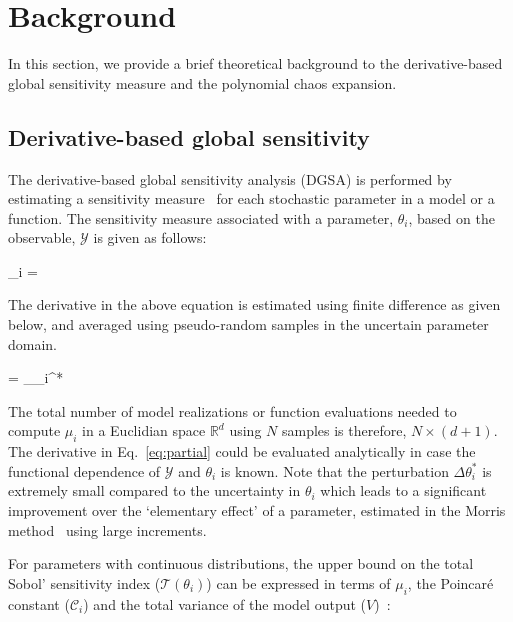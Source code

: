\section{Background}
\label{sec:bg}

In this section, we provide a brief theoretical background to the
derivative-based global sensitivity measure and the polynomial chaos
expansion.

\subsection{Derivative-based global sensitivity}  

The derivative-based global sensitivity analysis (DGSA) is performed by 
estimating a sensitivity measure~\cite{Sobol:2009} for each stochastic
parameter in a model or a function. The
sensitivity measure associated with a parameter, $\theta_i$, based on
the observable, $\mathcal{Y}$ is given as follows:

\be
\mu_i = 
\label{eq:mu}
\ee

\noindent The derivative in the above equation is estimated using finite
difference as given below, and averaged using pseudo-random samples in
the uncertain parameter domain. 

\be
{} =
 \lim_{\Delta\theta_i^{*}}
\label{eq:partial}
\ee

The total number of model realizations or function evaluations
needed to
compute $\mu_i$ in a Euclidian space $\mathbb{R}^d$ using $N$ samples is
therefore, $N\times(d+1)$. The derivative in Eq.~\ref{eq:partial} could be evaluated
analytically in case the functional dependence of $\mathcal{Y}$ and $\theta_i$
is known. Note that the perturbation $\Delta\theta_i^{*}$ is extremely small 
compared to the uncertainty in $\theta_i$ which leads to a significant improvement
over the `elementary effect' of a parameter, estimated in the Morris method~\cite{Morris:1991}
using large increments. 

For parameters with continuous distributions, the upper bound on the total 
Sobol' sensitivity index ($\mathcal{T}(\theta_i)$)
can be expressed in terms of $\mu_i$, the Poincar\'e constant ($\mathcal{C}_i$) and the total 
variance of the model output ($V$)~\cite{Lamboni:2013}:

